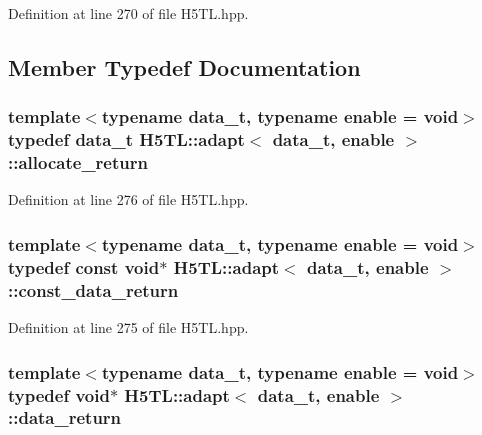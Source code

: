 Definition at line 270 of file H5\-T\-L.\-hpp.



\subsection{Member Typedef Documentation}
\hypertarget{struct_h5_t_l_1_1adapt_afc28c20e3ef90736e37e24cc8686fee6}{
\subsubsection[{allocate\-\_\-return}]{\setlength{\rightskip}{0pt plus 5cm}template$<$typename data\-\_\-t, typename enable = void$>$ typedef {\bf data\-\_\-t} {\bf H5\-T\-L\-::adapt}$<$ {\bf data\-\_\-t}, enable $>$\-::{\bf allocate\-\_\-return}}}\label{struct_h5_t_l_1_1adapt_afc28c20e3ef90736e37e24cc8686fee6}


Definition at line 276 of file H5\-T\-L.\-hpp.

\hypertarget{struct_h5_t_l_1_1adapt_a144eb8e2bcf76c4e10090c55ef208b2b}{
\subsubsection[{const\-\_\-data\-\_\-return}]{\setlength{\rightskip}{0pt plus 5cm}template$<$typename data\-\_\-t, typename enable = void$>$ typedef const void$\ast$ {\bf H5\-T\-L\-::adapt}$<$ {\bf data\-\_\-t}, enable $>$\-::{\bf const\-\_\-data\-\_\-return}}}\label{struct_h5_t_l_1_1adapt_a144eb8e2bcf76c4e10090c55ef208b2b}


Definition at line 275 of file H5\-T\-L.\-hpp.

\hypertarget{struct_h5_t_l_1_1adapt_a2899b8de59577b8c62a32c66e14a0243}{
\subsubsection[{data\-\_\-return}]{\setlength{\rightskip}{0pt plus 5cm}template$<$typename data\-\_\-t, typename enable = void$>$ typedef void$\ast$ {\bf H5\-T\-L\-::adapt}$<$ {\bf data\-\_\-t}, enable $>$\-::{\bf data\-\_\-return}}}\label{struct_h5_t_l_1_1adapt_a2899b8de59577b8c62a32c66e14a0243}


